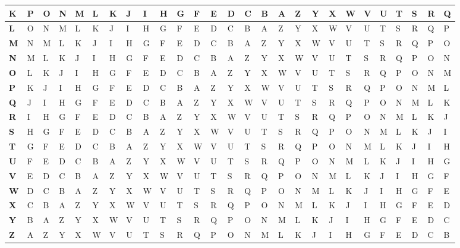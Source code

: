 \begin{table}[]
{\begin{tabular}{l|l|l|l|l|l|l|l|l|l|l|l|l|l|l|l|l|l|l|l|l|l|l|l|l|l|l|}
\multicolumn{1}{|l|}{\textbf{K}} & P & O & N & M & L & K & J & I & H & G & F & E & D & C & B & A & Z & Y & X & W & V & U & T & S & R & Q \\ \hline
\multicolumn{1}{|l|}{\textbf{L}} & O & N & M & L & K & J & I & H & G & F & E & D & C & B & A & Z & Y & X & W & V & U & T & S & R & Q & P \\ \hline
\multicolumn{1}{|l|}{\textbf{M}} & N & M & L & K & J & I & H & G & F & E & D & C & B & A & Z & Y & X & W & V & U & T & S & R & Q & P & O \\ \hline
\multicolumn{1}{|l|}{\textbf{N}} & M & L & K & J & I & H & G & F & E & D & C & B & A & Z & Y & X & W & V & U & T & S & R & Q & P & O & N \\ \hline
\multicolumn{1}{|l|}{\textbf{O}} & L & K & J & I & H & G & F & E & D & C & B & A & Z & Y & X & W & V & U & T & S & R & Q & P & O & N & M \\ \hline
\multicolumn{1}{|l|}{\textbf{P}} & K & J & I & H & G & F & E & D & C & B & A & Z & Y & X & W & V & U & T & S & R & Q & P & O & N & M & L \\ \hline
\multicolumn{1}{|l|}{\textbf{Q}} & J & I & H & G & F & E & D & C & B & A & Z & Y & X & W & V & U & T & S & R & Q & P & O & N & M & L & K \\ \hline
\multicolumn{1}{|l|}{\textbf{R}} & I & H & G & F & E & D & C & B & A & Z & Y & X & W & V & U & T & S & R & Q & P & O & N & M & L & K & J \\ \hline
\multicolumn{1}{|l|}{\textbf{S}} & H & G & F & E & D & C & B & A & Z & Y & X & W & V & U & T & S & R & Q & P & O & N & M & L & K & J & I \\ \hline
\multicolumn{1}{|l|}{\textbf{T}} & G & F & E & D & C & B & A & Z & Y & X & W & V & U & T & S & R & Q & P & O & N & M & L & K & J & I & H \\ \hline
\multicolumn{1}{|l|}{\textbf{U}} & F & E & D & C & B & A & Z & Y & X & W & V & U & T & S & R & Q & P & O & N & M & L & K & J & I & H & G \\ \hline
\multicolumn{1}{|l|}{\textbf{V}} & E & D & C & B & A & Z & Y & X & W & V & U & T & S & R & Q & P & O & N & M & L & K & J & I & H & G & F \\ \hline
\multicolumn{1}{|l|}{\textbf{W}} & D & C & B & A & Z & Y & X & W & V & U & T & S & R & Q & P & O & N & M & L & K & J & I & H & G & F & E \\ \hline
\multicolumn{1}{|l|}{\textbf{X}} & C & B & A & Z & Y & X & W & V & U & T & S & R & Q & P & O & N & M & L & K & J & I & H & G & F & E & D \\ \hline
\multicolumn{1}{|l|}{\textbf{Y}} & B & A & Z & Y & X & W & V & U & T & S & R & Q & P & O & N & M & L & K & J & I & H & G & F & E & D & C \\ \hline
\multicolumn{1}{|l|}{\textbf{Z}} & A & Z & Y & X & W & V & U & T & S & R & Q & P & O & N & M & L & K & J & I & H & G & F & E & D & C & B \\ \hline
\end{tabular}%
}
\end{table}

